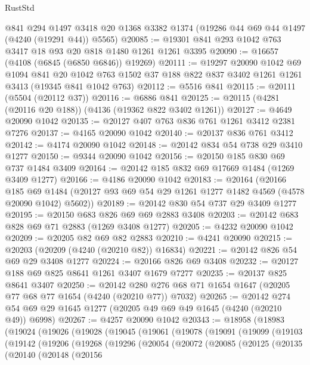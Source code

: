 \begin{lexlean}{RustStd}
\begin{coremodule}
{\begin{coremodule}
{{{{{{{{{{{{{{{{{{{{{{{{{{{{{{{{{{{    @841
    @294
    @1497
    @3418
    @20
    @1368
    @3382
    @1374
    (@19286 @44 @69 @44 @1497 (@4240 (@19291 @44)) @5565)
@20085 := @19301 @841 @293 @1042 @763 @3417 @18 @93 @20 @818 @1480 @1261 @1261 @3395
@20090 := @16657 (@4108 (@6845 (@6850 @6846)) @19269)
@20111 := @19297
    @20090
    @1042
    @69
    @1094
    @841
    @20
    @1042
    @763
    @1502
    @37
    @188
    @822
    @837
    @3402
    @1261
    @1261
    @3413
    (@19345 @841 @1042 @763)
@20112 := @5516 @841
@20115 := @20111 (@5504 (@20112 @37))
@20116 := @6886 @841
@20125 := @20115 (@4281 (@20116 @20 @188)) (@4136 (@19362 @822 @3402 @1261))
@20127 := @4649 @20090 @1042
@20135 := @20127 @407 @763 @836 @761 @1261 @3412 @2381 @7276
@20137 := @4165 @20090 @1042
@20140 := @20137 @836 @761 @3412
@20142 := @4174 @20090 @1042
@20148 := @20142 @834 @54 @738 @29 @3410 @1277
@20150 := @9344 @20090 @1042
@20156 := @20150 @185 @830 @69 @737 @1484 @3409
@20164 := @20142 @185 @832 @69 @17669 @1484 (@1269 @3409 @1277)
@20166 := @4186 @20090 @1042
@20183 := @20164
    (@20166
      @185
      @69
      @1484
      (@20127 @93 @69 @54 @29 @1261 @1277 @1482 @4569 (@4578 @20090 @1042) @5602))
@20189 := @20142 @830 @54 @737 @29 @3409 @1277
@20195 := @20150 @683 @826 @69 @69 @2883 @3408
@20203 := @20142 @683 @828 @69 @71 @2883 (@1269 @3408 @1277)
@20205 := @4232 @20090 @1042
@20209 := @20205 @82 @69 @82 @2883
@20210 := @4241 @20090
@20215 := @20203 (@20209 (@4240 (@20210 @82)) @16834)
@20221 := @20142 @826 @54 @69 @29 @3408 @1277
@20224 := @20166 @826 @69 @3408
@20232 := @20127 @188 @69 @825 @8641 @1261 @3407 @1679 @7277
@20235 := @20137 @825 @8641 @3407
@20250 := @20142 @280 @276 @68 @71 @1654 @1647 (@20205 @77 @68 @77 @1654 (@4240 (@20210 @77)) @7032)
@20265 := @20142 @274 @54 @69 @29 @1645 @1277 (@20205 @49 @69 @49 @1645 (@4240 (@20210 @49)) @6998)
@20267 := @4257 @20090 @1042
@20343 := @18958
    (@18983
      (@19024
        (@19026
          (@19028
            (@19045
              (@19061
                (@19078
                  (@19091
                    (@19099
                      (@19103
                        (@19142
                          (@19206
                            (@19268
                              (@19296
                                (@20054
                                  (@20072
                                    (@20085
                                      (@20125
                                        (@20135
                                          (@20140
                                            (@20148
                                              (@20156
}}}}}}}}}}}}}}}}}}}}}}}}}}}}}}}}}}}
\end{coremodule}}
\end{coremodule}
\end{lexlean}
